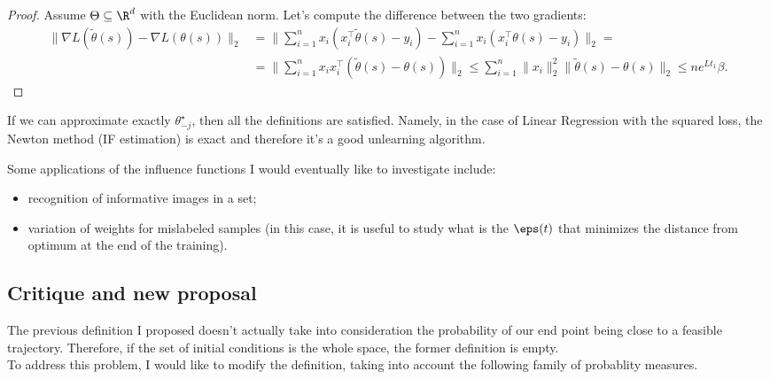 \begin{proof}
  Assume $\Theta\subseteq \R^d$ with the Euclidean norm.
  Let's compute the difference between the two gradients:
  \begin{equation*}
    \begin{aligned}
      \| \nabla L(\tilde{\theta}(s)) - \nabla L(\theta(s)) \|_2 &= \| \sum_{i=1}^n x_i (x_i^\top \tilde{\theta}(s) - y_i) - \sum_{i=1}^n x_i (x_i^\top \theta(s) - y_i) \|_2 = \\
      & = \| \sum_{i=1}^n x_i x_i^\top (\tilde{\theta}(s) - \theta(s)) \|_2 \leq \sum_{i=1}^n \|x_i\|_2^2 \|\tilde{\theta}(s) - \theta(s)\|_2 \leq n e^{L t_1} \beta.
    \end{aligned}
  \end{equation*}
\end{proof}

\begin{remark}
  If we can approximate exactly $\theta^\star_{-j}$, then all the definitions are satisfied.
  Name\-ly, in the case of Linear Regression with the squared loss, the Newton method (IF estimation) is exact and therefore it's a good unlearning algorithm.
\end{remark}

Some applications of the influence functions I would eventually like to investigate include:
\begin{itemize}
  \item recognition of informative images in a set;
  \item variation of weights for mislabeled samples (in this case, it is useful to study what is the $\eps(t)$ that minimizes the distance from optimum at the end of the training).
\end{itemize}

\subsection*{Critique and new proposal}
The previous definition I proposed doesn't actually take into consideration the pro\-babili\-ty of our end point being close to a feasible trajectory.
Therefore, if the set of initial conditions is the whole space, the former definition is empty.\\
To address this problem, I would like to modify the definition, taking into account the following family of probablity measures.

